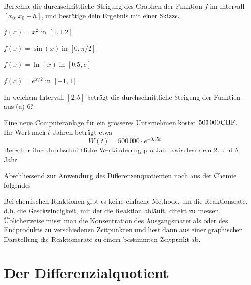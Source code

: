 \documentclass[%
11pt,%
twoside,%
titlepage,%
german,%
headsepline%
]{scrartcl}
\begin{document}
\begin{ueb}[Differenzenquotient]\label{uebdifferenzenquotient}
Berechne die durchschnittliche Steigung des Graphen der Funktion $f$ im Intervall $[x_0,x_0+h]$, und best\"atige dein Ergebnis mit einer Skizze.
\begin{enumeratea}
\item $f(x)=x^2$ in $[1,1.2]$
\item $f(x)=\sin(x)$ in $[0,\pi/2]$
\item $f(x)=\ln(x)$ in $[0.5,e]$
\item $f(x)=e^{x/2}$ in $[-1,1]$
\item In welchem Intervall $[2,b]$ betr\"agt die durchschnittliche Steigung der Funktion aus (a) $6$?
\end{enumeratea}
\end{ueb}

\begin{ueb}[Computer]\label{uebcomputer}
Eine neue Computeranlage f\"ur ein gr\"osseres Unternehmen kostet $\unit[500\,000]{CHF}$. Ihr Wert nach $t$ Jahren betr\"agt etwa
$$W(t)=500\,000\cdot e^{-0.35t}.$$
Berechne ihre durchschnittliche Wert\"anderung pro Jahr zwischen dem 2. und 5. Jahr.
\end{ueb}

Abschliessend zur Anwendung des Differenzenquotienten noch aus der Chemie folgendes
\begin{bsp}
Bei chemischen Reaktionen gibt es keine einfache Methode, um die Reaktionsrate, d.h. die Geschwindigkeit, mit der die Reaktion abl\"auft, direkt zu messen. \"Ublicherweise misst man die Konzentration des Ausgangsmaterials oder des Endprodukts zu verschiedenen Zeitpunkten und liest dann aus einer graphischen Darstellung die Reaktionsrate zu einem bestimmten Zeitpunkt ab.
\end{bsp}

\clearpage

\section{Der Differenzialquotient}
\end{document}
